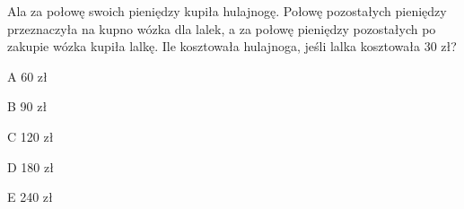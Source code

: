 \begin{tresc}
Ala za połowę swoich pieniędzy kupiła hulajnogę. Połowę pozostałych pieniędzy przeznaczyła na kupno wózka dla lalek, a za połowę pieniędzy pozostałych po zakupie wózka kupiła lalkę. Ile kosztowała hulajnoga, jeśli lalka kosztowała 30 zł?
\end{tresc}
\begin{wariant}{A} 60 zł \end{wariant}
\begin{wariant}{B} 90 zł \end{wariant}
\begin{wariant}{C} 120 zł \end{wariant}
\begin{wariant}{D} 180 zł \end{wariant}
\begin{wariant}{E} 240 zł \end{wariant}
